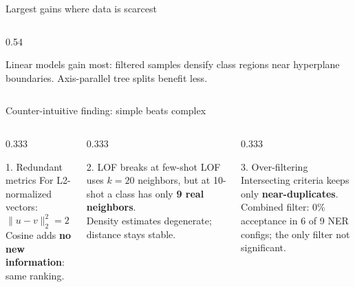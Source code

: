 \begin{frame}{Largest gains where data is scarcest}
\begin{columns}[T]
\begin{column}{0.54\textwidth}
\vspace{0.3em}
\begin{insight}
\scriptsize
Linear models gain most: filtered samples densify class regions near hyperplane
boundaries. Axis-parallel tree splits benefit less.
\end{insight}
\end{column}
\end{columns}

\end{frame}

\begin{frame}{Counter-intuitive finding: simple beats complex}
\begin{columns}[T]
\begin{column}{0.333\textwidth}
\begin{mechbox}[colframe=uaiblue, colbacktitle=uaiblue]{1. Redundant metrics}
For L2-normalized vectors:
\[
\lVert u-v \rVert_2^2 = 2\,(1-\cos(u,v))
\]
Cosine adds \textbf{no new information}: same ranking.
\end{mechbox}
\end{column}
\begin{column}{0.333\textwidth}
\begin{mechbox}[colframe=uaiamber, colbacktitle=uaiamber]{2. LOF breaks at few-shot}
LOF uses $k=20$ neighbors, but at 10-shot a class has only \textbf{9 real neighbors}.\\[3pt]
Density estimates degenerate; distance stays stable.
\end{mechbox}
\end{column}
\begin{column}{0.333\textwidth}
\begin{mechbox}[colframe=uaiorange, colbacktitle=uaiorange]{3. Over-filtering}
Intersecting criteria keeps only \textbf{near-duplicates}.\\[3pt]
Combined filter: \alert{0\% acceptance} in 6 of 9 NER configs; the only filter not significant.
\end{mechbox}
\end{column}
\end{columns}


\end{frame}
